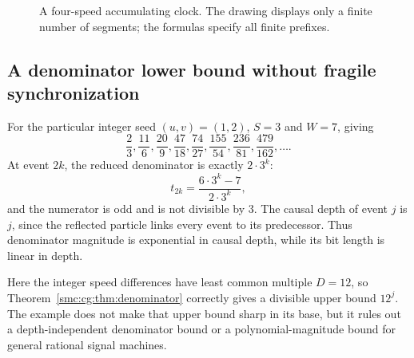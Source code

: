 \documentclass[11pt,letterpaper]{article}
\numberwithin{equation}{section}
\theoremstyle{definition}
\theoremstyle{remark}
\begin{document}
\begin{figure}[htbp]
\centering
{}
\caption{A four-speed accumulating clock. The drawing displays only a finite
number of segments; the formulas specify all finite prefixes.}
\label{smc:cg:fig:clock}
\end{figure}

\subsection{A denominator lower bound without fragile synchronization}

For the particular integer seed $(u,v)=(1,2)$, $S=3$ and $W=7$, giving
\[
 \frac23,\frac{11}6,\frac{20}9,\frac{47}{18},\frac{74}{27},
 \frac{155}{54},\frac{236}{81},\frac{479}{162},\ldots.
\]
At event $2k$, the reduced denominator is exactly $2\cdot3^k$:
\[
 t_{2k}=\frac{6\cdot3^k-7}{2\cdot3^k},
\]
and the numerator is odd and is not divisible by $3$. The causal depth of
event $j$ is $j$, since the reflected particle links every event to its
predecessor. Thus denominator magnitude is exponential in causal depth,
while its bit length is linear in depth.

Here the integer speed differences have least common multiple $D=12$,
so Theorem~\ref{smc:cg:thm:denominator} correctly gives a divisible upper bound
$12^j$. The example does not make that upper bound sharp in its base, but it
rules out a depth-independent denominator bound or a polynomial-magnitude
bound for general rational signal machines.
\end{document}
